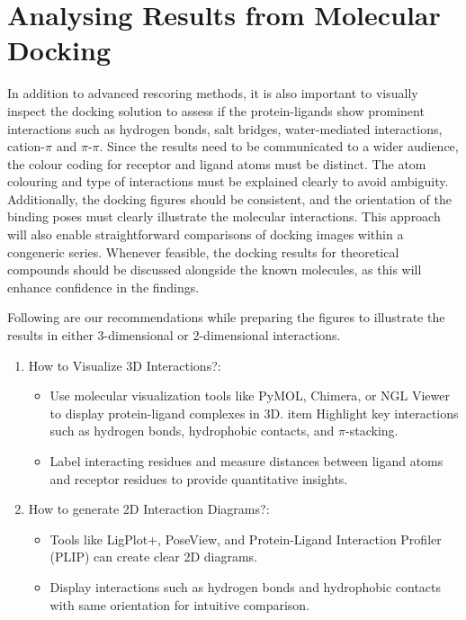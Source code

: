 \chapter*{Analysing Results from Molecular Docking}

In addition to advanced rescoring methods, it is also important to visually inspect the docking solution to assess if the protein-ligands show prominent interactions such as hydrogen bonds, salt bridges, water-mediated interactions, cation-$\pi$ and $\pi$-$\pi$. Since the results need to be communicated to a wider audience, the colour coding for receptor and ligand atoms must be distinct. The atom colouring and type of interactions must be explained clearly to avoid ambiguity. Additionally, the docking figures should be consistent, and the orientation of the binding poses must clearly illustrate the molecular interactions. This approach will also enable straightforward comparisons of docking images within a congeneric series. Whenever feasible, the docking results for theoretical compounds should be discussed alongside the known molecules, as this will enhance confidence in the findings.

Following are our recommendations while preparing the figures to illustrate the results in either 3-dimensional or 2-dimensional interactions. 
\begin{enumerate}
    \item How to Visualize 3D Interactions?:
    \begin{itemize}
	       \item Use molecular visualization tools like PyMOL\cite{bib65}, Chimera\cite{bib66}, or NGL Viewer\cite{bib67} to display protein-ligand complexes in 3D. 
           item Highlight key interactions such as hydrogen bonds, hydrophobic contacts, and $\pi$-stacking.
	       \item Label interacting residues and measure distances between ligand atoms and receptor residues to provide quantitative insights.
    \end{itemize}
    \item How to generate 2D Interaction Diagrams?:
        \begin{itemize}
            \item Tools like LigPlot+\cite{bib68}, PoseView\cite{bib69}, and Protein-Ligand Interaction Profiler (PLIP)\cite{bib70} can create clear 2D diagrams. 
            \item Display interactions such as hydrogen bonds and hydrophobic contacts with same orientation for intuitive comparison. 
        \end{itemize}    
\end{enumerate}    
